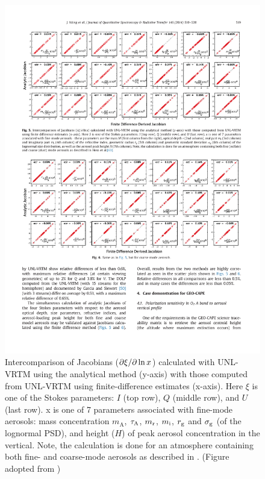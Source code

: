 \begin{landscape}
\begin{figure}[p]
  \centering
  \includegraphics[width={1.4\textwidth}]{figures/unlvrtm4.pdf}
  \caption{Intercomparison of Jacobians ($\partial\xi/\partial\ln{x}$) 
calculated with UNL-VRTM using the analytical method (y-axis) with 
those computed from UNL-VRTM using finite-difference estimates (x-axis). 
Here $\xi$ is one of the Stokes parameters: $I$ (top row), $Q$
(middle row), and $U$ (last row). x is one of 7 parameters associated 
with fine-mode aerosols: mass concentration $m_\text{A}$, $\tau_\text{A}$,
$m_\text{r}$, $m_\text{i}$, $r_\text{g}$ and $\sigma_\text{g}$ (of the lognormal PSD), and height
($H$) of peak aerosol concentration in the vertical. Note,
the calculation is done for an atmosphere containing both fine- 
and coarse-mode aerosols as described in \citet{Hess98}.
(Figure adopted from \citet{Wang14}) }
  \label{fig:unlvrtm4}
\end{figure}
\end{landscape}

